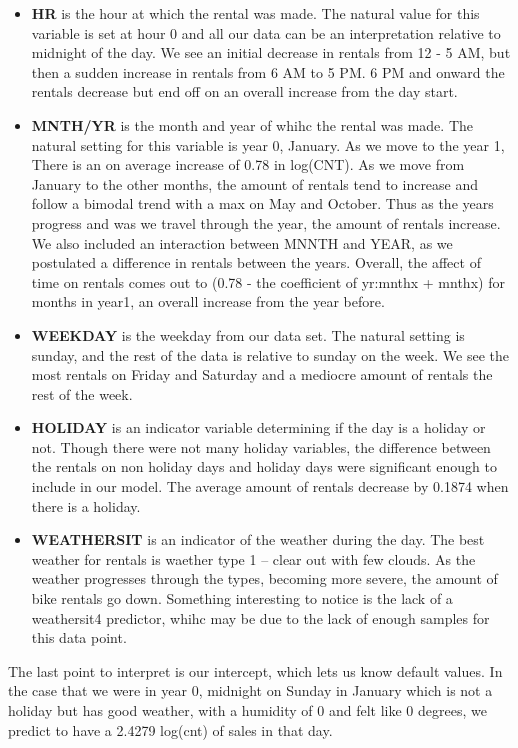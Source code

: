 \documentclass[]{article}
\begin{document}
\begin{itemize}
\item
  \textbf{HR} is the hour at which the rental was made. The natural
  value for this variable is set at hour 0 and all our data can be an
  interpretation relative to midnight of the day. We see an initial
  decrease in rentals from 12 - 5 AM, but then a sudden increase in
  rentals from 6 AM to 5 PM. 6 PM and onward the rentals decrease but
  end off on an overall increase from the day start.
\item
  \textbf{MNTH/YR} is the month and year of whihc the rental was made.
  The natural setting for this variable is year 0, January. As we move
  to the year 1, There is an on average increase of 0.78 in log(CNT). As
  we move from January to the other months, the amount of rentals tend
  to increase and follow a bimodal trend with a max on May and October.
  Thus as the years progress and was we travel through the year, the
  amount of rentals increase. We also included an interaction between
  MNNTH and YEAR, as we postulated a difference in rentals between the
  years. Overall, the affect of time on rentals comes out to (0.78 - the
  coefficient of yr:mnthx + mnthx) for months in year1, an overall
  increase from the year before.
\item
  \textbf{WEEKDAY} is the weekday from our data set. The natural setting
  is sunday, and the rest of the data is relative to sunday on the week.
  We see the most rentals on Friday and Saturday and a mediocre amount
  of rentals the rest of the week.
\item
  \textbf{HOLIDAY} is an indicator variable determining if the day is a
  holiday or not. Though there were not many holiday variables, the
  difference between the rentals on non holiday days and holiday days
  were significant enough to include in our model. The average amount of
  rentals decrease by 0.1874 when there is a holiday.
\item
  \textbf{WEATHERSIT} is an indicator of the weather during the day. The
  best weather for rentals is waether type 1 -- clear out with few
  clouds. As the weather progresses through the types, becoming more
  severe, the amount of bike rentals go down. Something interesting to
  notice is the lack of a weathersit4 predictor, whihc may be due to the
  lack of enough samples for this data point.
\end{itemize}

The last point to interpret is our intercept, which lets us know default
values. In the case that we were in year 0, midnight on Sunday in
January which is not a holiday but has good weather, with a humidity of
0 and felt like 0 degrees, we predict to have a 2.4279 log(cnt) of sales
in that day.
\end{document}
